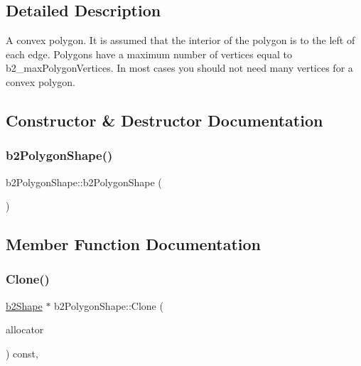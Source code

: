 \subsection{Detailed Description}
A convex polygon. It is assumed that the interior of the polygon is to the left of each edge. Polygons have a maximum number of vertices equal to b2\+\_\+max\+Polygon\+Vertices. In most cases you should not need many vertices for a convex polygon. 

\subsection{Constructor \& Destructor Documentation}
\mbox{\label{classb2_polygon_shape_a76d778e6b374e4d22167a609dc0333a4}} 
\subsubsection{\texorpdfstring{b2PolygonShape()}{b2PolygonShape()}}
{\footnotesize\ttfamily b2\+Polygon\+Shape\+::b2\+Polygon\+Shape (\begin{DoxyParamCaption}{ }\end{DoxyParamCaption})\hspace{0.3cm}{\ttfamily [inline]}}



\subsection{Member Function Documentation}
\mbox{\label{classb2_polygon_shape_ae2c2343be33db465f7e83db2061fdd51}} 
\subsubsection{\texorpdfstring{Clone()}{Clone()}}
{\footnotesize\ttfamily \mbox{\hyperlink{classb2_shape}{b2\+Shape}} $\ast$ b2\+Polygon\+Shape\+::\+Clone (\begin{DoxyParamCaption}\item[{\mbox{\hyperlink{classb2_block_allocator}{b2\+Block\+Allocator}} $\ast$}]{allocator }\end{DoxyParamCaption}) const\hspace{0.3cm}{\ttfamily [override]}, {\ttfamily [virtual]}}



